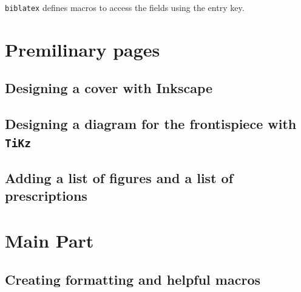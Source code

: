 \documentclass[16pt,letter,oneside,usenames,dvipsnames]{memoir}
\newcommand\biblatex{\texttt{biblatex}\xspace}%
\begin{document}
\biblatex defines macros to access the fields using the entry key.

\skelpar
%
\begin{figure}{\centering%
%
\skelcaption[width=0.2\textwidth,lines=1]{}}
\end{figure}{}

\part{Premilinary pages}

\chapter{Designing a cover with Inkscape}
%
\begin{figure}{\centering%
%
\skelcaption[width=0.2\textwidth,lines=1]{}}
\end{figure}{}
%
\begin{figure}{\centering%
%
\skelcaption[width=0.2\textwidth,lines=1]{}}
\end{figure}{}

\chapter{Designing a diagram for the frontispiece with \texttt{TiKz}}
%
\begin{figure}{\centering%
%
\skelcaption[width=0.2\textwidth,lines=1]{}}
\end{figure}{}

\chapter{Adding a list of figures and a list of prescriptions}
%
\begin{figure}{\centering%
%
\skelcaption[width=0.2\textwidth,lines=1]{}}
\end{figure}{}

\part{Main Part}

\chapter{Creating formatting and helpful macros}
\end{document}
